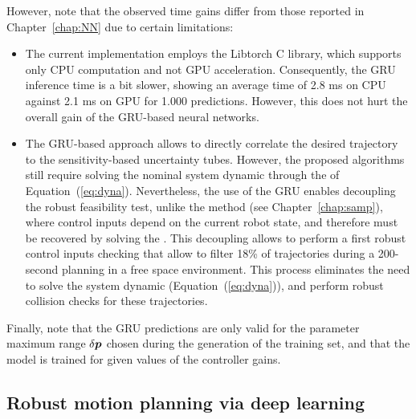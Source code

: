 However, note that the observed time gains differ from those reported in Chapter~\ref{chap:NN} due to certain limitations:
\begin{itemize}
    \item The current implementation employs the Libtorch C library, which supports only CPU computation and not GPU acceleration.
    Consequently, the GRU inference time is a bit slower, showing an average time of 2.8 ms on CPU against 2.1 ms on GPU for 1.000 predictions.
    However, this does not hurt the overall gain of the GRU-based neural networks.
    \item The GRU-based approach allows to directly correlate the desired trajectory to the sensitivity-based uncertainty tubes.
    However, the proposed  algorithms still require solving the nominal system dynamic through the  of Equation~(\ref{eq:dyna}).
    Nevertheless, the use of the GRU enables decoupling the robust feasibility test, unlike the  method (see Chapter~\ref{chap:samp}), where control inputs depend on the current robot state, and therefore must be recovered by solving the .
    This decoupling allows to perform a first robust control inputs checking that allow to filter 18\% of trajectories during a 200-second planning in a free space environment.
    This process eliminates the need to solve the system dynamic  (Equation~(\ref{eq:dyna})), and perform robust collision checks for these trajectories.
\end{itemize}

Finally, note that the GRU predictions are only valid for the parameter maximum range $\delta\boldsymbol{p}$ chosen during the generation of the training set, and that the model is trained for given values of the controller gains.

\subsection{Robust motion planning via deep learning} \label{sec:RobustPlanSimu}

